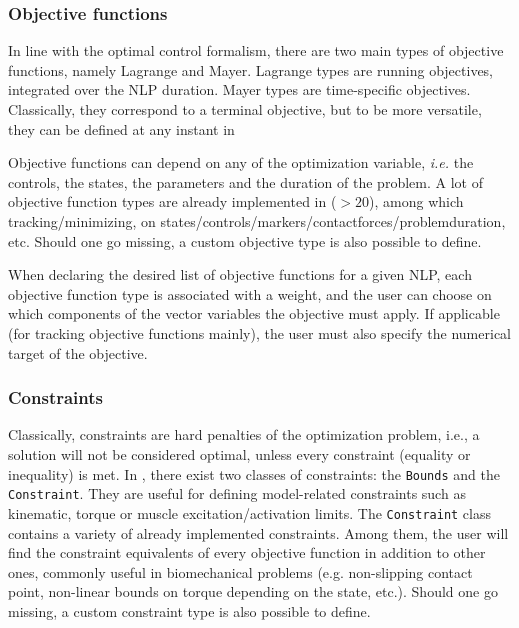 \subsubsection{Objective functions}
In line with the optimal control formalism, there are two main types of objective functions, namely Lagrange and Mayer. 
Lagrange types are running objectives, integrated over the NLP duration. Mayer types are time-specific objectives. 
Classically, they correspond to a terminal objective, but to be more versatile, they can be defined at any instant in \bioptim{}

Objective functions can depend on any of the optimization variable, \textit{i.e.} the controls, the states, the parameters and the duration of the problem. 
A lot of objective function types are already implemented in \bioptim ($>\!20$), among which tracking\:/\:minimizing, on states\:/\:controls\:/\:markers\:/\:contact\:forces\:/\:problem\:duration, etc. 
Should one go missing, a custom objective type is also possible to define.

When declaring the desired list of objective functions for a given NLP, each objective function type is associated with a weight, and the user can choose on which components of the vector variables the objective must apply. 
If applicable (for tracking objective functions mainly), the user must also specify the numerical target of the objective.

\subsubsection{Constraints}
Classically, constraints are hard penalties of the optimization problem, i.e., a solution will not be considered optimal, unless every constraint (equality or inequality) is met.
In \bioptim, there exist two classes of constraints: the \texttt{Bounds} and the \texttt{Constraint}.
They are useful for defining model-related constraints such as kinematic, torque or muscle excitation\:/\:activation limits. 
The \texttt{Constraint} class contains a variety of already implemented constraints.
Among them, the user will find the constraint equivalents of every objective function in addition to  other ones, commonly useful in biomechanical problems (e.g. non-slipping contact point, non-linear bounds on torque depending on the state, etc.).
Should one go missing, a custom constraint type is also possible to define.

